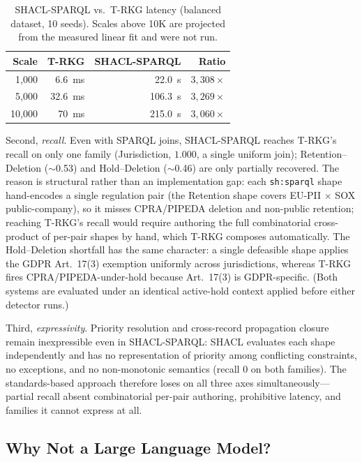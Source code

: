 \documentclass{ieeeaccess}
\begin{document}
\begin{table}[t]
\centering
\caption{SHACL-SPARQL vs.\ T-RKG latency (balanced dataset, 10 seeds). Scales above 10K are projected from the measured linear fit and were not run.}
\label{tab:shaclsparql}
\begin{tabular}{rrrr}
\hline\hline
Scale & T-RKG & SHACL-SPARQL & Ratio \\
\hline
1{,}000  & 6.6~ms  & 22.0~s  & $3{,}308\times$ \\
5{,}000  & 32.6~ms & 106.3~s & $3{,}269\times$ \\
10{,}000 & 70~ms  & 215.0~s & $3{,}060\times$ \\
\hline\hline
\end{tabular}
\end{table}

Second, \emph{recall}. Even with SPARQL joins, SHACL-SPARQL reaches T-RKG's recall on only one family (Jurisdiction, $1.000$, a single uniform join); Retention--Deletion ($\sim$0.53) and Hold--Deletion ($\sim$0.46) are only partially recovered. The reason is structural rather than an implementation gap: each \texttt{sh:sparql} shape hand-encodes a single regulation pair (the Retention shape covers EU-PII $\times$ SOX public-company), so it misses CPRA/PIPEDA deletion and non-public retention; reaching T-RKG's recall would require authoring the full combinatorial cross-product of per-pair shapes by hand, which T-RKG composes automatically. The Hold--Deletion shortfall has the same character: a single defeasible shape applies the GDPR Art.~17(3) exemption uniformly across jurisdictions, whereas T-RKG fires CPRA/PIPEDA-under-hold because Art.~17(3) is GDPR-specific. (Both systems are evaluated under an identical active-hold context applied before either detector runs.)

Third, \emph{expressivity}. Priority resolution and cross-record propagation closure remain inexpressible even in SHACL-SPARQL: SHACL evaluates each shape independently and has no representation of priority among conflicting constraints, no exceptions, and no non-monotonic semantics (recall $0$ on both families). The standards-based approach therefore loses on all three axes simultaneously---partial recall absent combinatorial per-pair authoring, prohibitive latency, and families it cannot express at all.

\subsection{Why Not a Large Language Model?}
\label{sec:llm}
\end{document}
